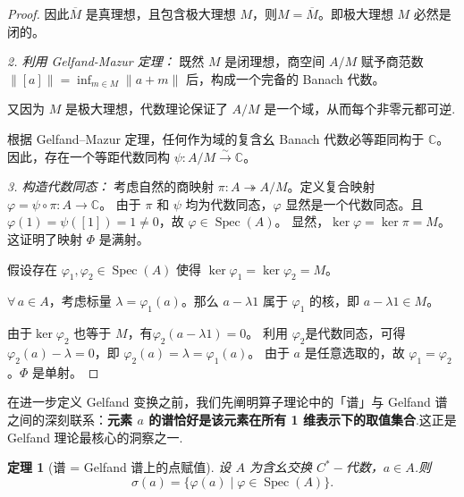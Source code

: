 \documentclass[math-font=lm, text-font=lm, math-style=TeX]{sjtureport}
\newtheorem{theorem}{定理}[chapter]
\theoremstyle{plain}
\newtheorem*{proof}{证明}
\theoremstyle{plain}
\DeclareMathOperator{\Spec}{Spec}
\begin{document}
\begin{proof}
    因此$\overline{M}$ 是真理想，且包含极大理想 $M$，则$M = \overline{M}$。即极大理想 $M$ 必然是闭的。\par
    \textit{2. 利用 Gelfand-Mazur 定理：}
    既然 $M$ 是闭理想，商空间 $A/M$ 赋予商范数 $\| [a] \| = \inf_{m \in M} \|a+m\|$ 后，构成一个完备的 Banach 代数。 \par
    又因为 $M$ 是极大理想，代数理论保证了 $A/M$ 是一个域，从而每个非零元都可逆.\par
    根据 Gelfand--Mazur 定理，任何作为域的复含幺 Banach 代数必等距同构于 $\mathbb{C}$。因此，存在一个等距代数同构 $\psi: A/M \xrightarrow{\sim} \mathbb{C}$。\par
    \textit{3. 构造代数同态：}
    考虑自然的商映射 $\pi: A \twoheadrightarrow A/M$。定义复合映射 $\varphi = \psi \circ \pi: A \to \mathbb{C}$。
    由于 $\pi$ 和 $\psi$ 均为代数同态，$\varphi$ 显然是一个代数同态。且 $\varphi(1) = \psi([1]) = 1 \neq 0$，故 $\varphi \in \Spec(A)$。
    显然，$\ker\varphi = \ker\pi = M$。这证明了映射 $\Phi$ 是满射。

    
    假设存在 $\varphi_1, \varphi_2 \in \Spec(A)$ 使得 $\ker\varphi_1 = \ker\varphi_2 = M$。\par
    $\forall\, a \in A$，考虑标量 $\lambda = \varphi_1(a)$。那么 $a - \lambda 1$ 属于 $\varphi_1$ 的核，即 $a - \lambda 1 \in M$。\par
    由于$\ker\varphi_2$ 也等于 $M$，有$\varphi_2(a - \lambda 1) = 0$。
    利用 $\varphi_2$是代数同态，可得 $\varphi_2(a) - \lambda = 0$，即 $\varphi_2(a) = \lambda = \varphi_1(a)$。
    由于 $a$ 是任意选取的，故 $\varphi_1 = \varphi_2$。$\Phi$ 是单射。
\end{proof}


在进一步定义 Gelfand 变换之前，我们先阐明算子理论中的「谱」与 Gelfand 谱之间的深刻联系：\textbf{元素 $a$ 的谱恰好是该元素在所有 1 维表示下的取值集合}.这正是 Gelfand 理论最核心的洞察之一.

\begin{theorem}[谱 = Gelfand 谱上的点赋值]\label{thm:spectrum-range}
    设 $A$ 为含幺交换 $C^*-\!$代数，$a \in A$.则
    \begin{equation}\label{eq:spectrum-range}
        \boxed{\sigma(a) = \{\varphi(a) \mid \varphi \in \Spec(A)\}}.
    \end{equation}
\end{theorem}
\end{document}
